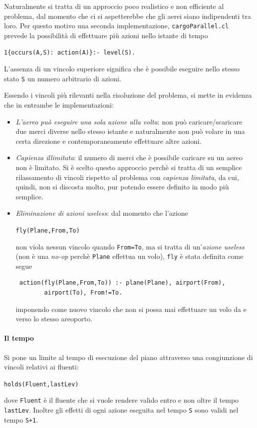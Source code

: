 \documentclass[a4paper,oneside,12pt]{book}
\begin{document}
    Naturalmente si tratta di un approccio poco realistico e non efficiente al problema, dal momento
    che ci si aspetterebbe che gli aerei siano indipendenti tra loro.
    Per questo motivo una seconda implementazione, \texttt{cargoParallel.cl} prevede la possibilità di
    effettuare più azioni nello istante di tempo
    \begin{center}
        \texttt{1\{occurs(A,S): action(A)\}:- level(S).}
    \end{center}
    L'assenza di un vincolo superiore significa che è possibile eseguire nello stesso stato \texttt{S}
    un numero arbitrario di azioni.

    Essendo i vincoli più rilevanti nella risoluzione del problema, si mette in evidenza che in entrambe
    le implementazioni:
    \begin{itemize}
        \item \textit{L'aereo può eseguire una sola azione alla volta}: non può caricare/scaricare due
        merci diverse nello stesso istante e naturalmente non può volare in una certa direzione e
        contemporaneamente effettuare altre azioni.
        \item \textit{Capienza illimitata}: il numero di merci che è possibile caricare su un aereo
        non è limitato.
        Si è scelto questo approccio perchè si tratta di un semplice rilassamento di vincoli rispetto al
        problema con \textit{capienza limitata}, da cui, quindi, non si discosta molto, pur potendo essere
        definito in modo più semplice.
        \item \textit{Eliminazione di azioni useless}: dal momento che l'azione
        \begin{center}
            \texttt{fly(Plane,From,To)}
        \end{center}
        non viola nessun vincolo quando \texttt{From=To}, ma si tratta di un'\textit{azione useless} (non è una
        \textit{no-op} perchè \texttt{Plane} effettua un volo), \texttt{fly} è stata definita come segue
        \begin{verbatim} action(fly(Plane,From,To)) :- plane(Plane), airport(From),
        airport(To), From!=To.
        \end{verbatim}
        imponendo come nuovo vincolo che non si possa mai effettuare un volo da e verso lo stesso areoporto.
    \end{itemize}

    \paragraph*{Il tempo\\}
    Si pone un limite al tempo di esecuzione del piano attraverso una congiunzione di vincoli relativi ai fluenti:
    \begin{center}
        \texttt{holds(Fluent,lastLev)}
    \end{center}
    dove \texttt{Fluent} è il fluente che si vuole rendere valido entro e non oltre il tempo \texttt{lastLev}.
    Inoltre gli effetti di ogni azione eseguita nel tempo \texttt{S} sono validi nel tempo \texttt{S+1}.
\end{document}
